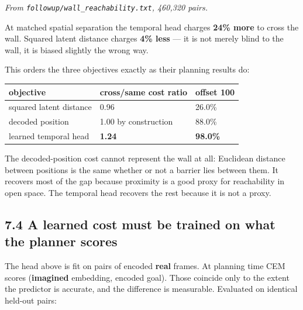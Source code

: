 \documentclass[10pt]{article}
\newcounter{none}
\begin{document}
\emph{From \texttt{followup/wall\_reachability.txt}, 460,320 pairs.}

At matched spatial separation the temporal head charges \textbf{24\% more} to cross
the wall. Squared latent distance charges \textbf{4\% less} --- it is not merely blind
to the wall, it is biased slightly the wrong way.

This orders the three objectives exactly as their planning results do:

{\def\LTcaptype{none} %
\begin{longtable}[]{@{}lll@{}}
\toprule\noalign{}
objective & cross/same cost ratio & offset 100 \\
\midrule\noalign{}
\endhead
\bottomrule\noalign{}
\endlastfoot
squared latent distance & 0.96 & 26.0\% \\
decoded position & 1.00 by construction & 88.0\% \\
learned temporal head & \textbf{1.24} & \textbf{98.0\%} \\
\end{longtable}
}

The decoded-position cost cannot represent the wall at all: Euclidean distance
between positions is the same whether or not a barrier lies between them. It
recovers most of the gap because proximity is a good proxy for reachability in
open space. The temporal head recovers the rest because it is not a proxy.

\subsection{7.4 A learned cost must be trained on what the planner scores}\label{a-learned-cost-must-be-trained-on-what-the-planner-scores}

The head above is fit on pairs of encoded \textbf{real} frames. At planning time
CEM scores (\textbf{imagined} embedding, encoded goal). Those coincide only to the
extent the predictor is accurate, and the difference is measurable. Evaluated
on identical held-out pairs:
\end{document}

